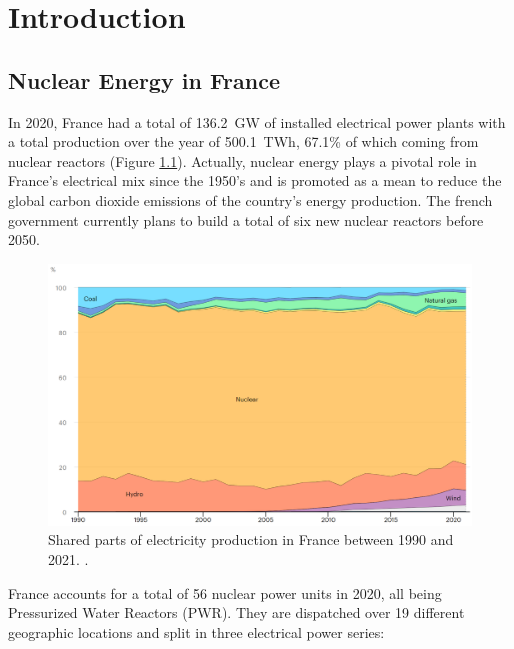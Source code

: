 
\chapter{Introduction} %

\label{ch:introduction} %




\minitoc

\section{Nuclear Energy in France}

In 2020, France had a total of 136.2~GW of installed electrical power plants with a total production over the year of 500.1~TWh, 67.1\% of which coming from nuclear reactors (Figure \ref{fig:france_energy_mix}). Actually, nuclear energy plays a pivotal role in France's electrical mix since the 1950's and is promoted as a mean to reduce the global carbon dioxide emissions of the country's energy production. The french government currently plans to build a total of six new nuclear reactors before 2050.

\begin{figure}[!h]
\centering
\includegraphics[width=0.8\linewidth]{img/intro/energy_france.png}
\caption{Shared parts of electricity production in France between 1990 and 2021. \cite{iaea_france_nodate}. }
\label{fig:france_energy_mix}
\end{figure}

\npar

France accounts for a total of 56 nuclear power units in 2020, all being Pressurized Water Reactors (PWR). They are dispatched over 19 different geographic locations and split in three electrical power series:

